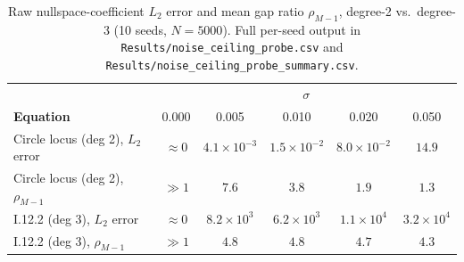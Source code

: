 \documentclass{article}
\begin{document}
\begin{table}[H]
\centering
\caption{Raw nullspace-coefficient $L_2$ error and mean gap ratio $\rho_{M-1}$, degree-2 vs.\ degree-3 (10 seeds, $N=5000$). Full per-seed output in \texttt{Results/noise\_ceiling\_probe.csv} and \texttt{Results/noise\_ceiling\_probe\_summary.csv}.}
\label{tab:noise-ceiling-probe}
\begin{tabular}{lccccc}
\toprule
& \multicolumn{5}{c}{$\sigma$}\\
\textbf{Equation} & 0.000 & 0.005 & 0.010 & 0.020 & 0.050\\
\midrule
Circle locus (deg 2), $L_2$ error   & $\approx 0$ & $4.1\times10^{-3}$ & $1.5\times10^{-2}$ & $8.0\times10^{-2}$ & $14.9$\\
Circle locus (deg 2), $\rho_{M-1}$  & $\gg 1$ & $7.6$ & $3.8$ & $1.9$ & $1.3$\\
\addlinespace
I.12.2 (deg 3), $L_2$ error   & $\approx 0$ & $8.2\times10^{3}$ & $6.2\times10^{3}$ & $1.1\times10^{4}$ & $3.2\times10^{4}$\\
I.12.2 (deg 3), $\rho_{M-1}$  & $\gg 1$ & $4.8$ & $4.8$ & $4.7$ & $4.3$\\
\bottomrule
\end{tabular}
\end{table}
\end{document}
